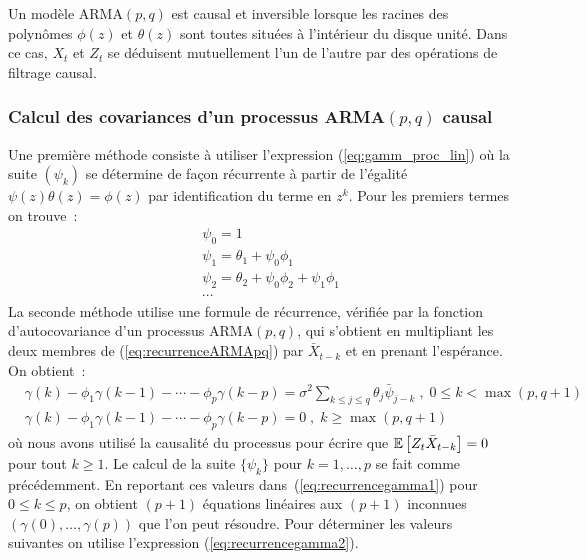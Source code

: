 Un mod\`ele ARMA$(p,q)$ est causal et inversible lorsque
les racines des polyn\^omes $\phi(z)$ et $\theta(z)$ sont toutes
situ\'ees \`a l'intérieur du disque unit\'e. Dans ce cas, $X_t$ et $Z_t$
se d\'eduisent mutuellement l'un de l'autre par des op\'erations de
filtrage causal.

\subsubsection{Calcul des covariances d'un processus ARMA$(p,q)$ causal}
Une premi\`ere m\'ethode consiste \`a utiliser l'expression
(\ref{eq:gamm_proc_lin}) %
   o\`u la suite $(\psi_k)$ se d\'etermine de fa\c{c}on r\'ecurrente \`a partir de
   l'\'egalit\'e $\psi(z)\theta(z)=\phi(z)$ par identification du terme en $z^k$.
   Pour les premiers termes on trouve~:
\begin{eqnarray*}
 &&\psi_0=1\\
 &&\psi_1=\theta_1+\psi_0\phi_1\\
 &&\psi_2=\theta_2+\psi_0\phi_2+\psi_1\phi_1\\
 &&\cdots
\end{eqnarray*}
La seconde m\'ethode utilise une formule de r\'ecurrence, v\'erifi\'ee par
la fonction d'autocovariance d'un processus ARMA$(p,q)$, qui
s'obtient en multipliant les deux membres de
(\ref{eq:recurrenceARMApq}) par $\bar{X}_{t-k}$ et en prenant
l'esp\'erance. On obtient~:
\begin{align}
 \label{eq:recurrencegamma1}
  &\gamma(k)-\phi_1\gamma(k-1)-\cdots-\phi_p\gamma(k-p)
  =
  \sigma^2\sum_{k\leq j\leq q}\theta_j\bar{\psi}_{j-k}\;,\;
0\leq k < \max(p,q+1)
  \\
 \label{eq:recurrencegamma2}
  &\gamma(k)-\phi_1\gamma(k-1)-\cdots-\phi_p\gamma(k-p)
  =
  0\;,\; k \geq \max(p,q+1)
\end{align}
o\`u nous avons utilis\'e la causalit\'e du processus pour \'ecrire
que ${\mathbb E}\left[ Z_t \bar{X}_{t-k} \right]=0$ pour tout $k\geq 1$. Le calcul de la
suite $\{\psi_k\}$ pour $k=1,\dots, p$ se fait comme pr\'ec\'edemment.
En reportant ces valeurs dans~(\ref{eq:recurrencegamma1}) pour
$0\leq k \leq p$, on obtient $(p+1)$ \'equations lin\'eaires aux
$(p+1)$ inconnues $(\gamma(0),\dots,\gamma(p))$ que l'on peut
r\'esoudre. Pour d\'eterminer les valeurs suivantes on utilise
l'expression (\ref{eq:recurrencegamma2}).
